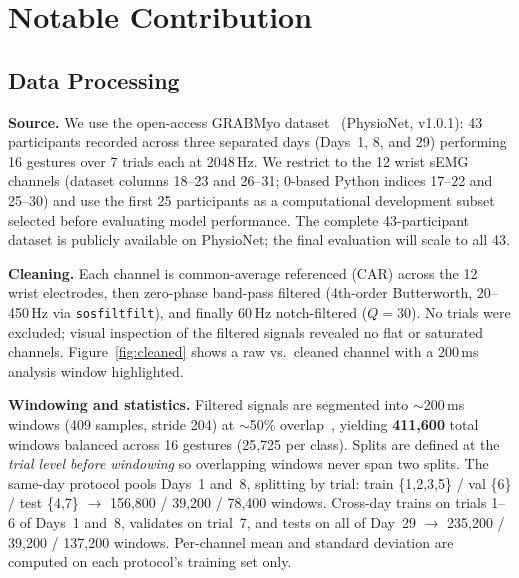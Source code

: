 \documentclass[final]{article}
\begin{document}
\section{Notable Contribution}

\subsection{Data Processing}

\textbf{Source.}
We use the open-access GRABMyo dataset~\citep{pradhan2022grabmyo,jiang2022grabmyophysionet} (PhysioNet, v1.0.1): 43 participants recorded across three separated days (Days~1, 8, and 29) performing 16 gestures over 7 trials each at 2048\,Hz. We restrict to the 12 wrist sEMG channels (dataset columns 18--23 and 26--31; 0-based Python indices 17--22 and 25--30) and use the first 25 participants as a computational development subset selected before evaluating model performance. The complete 43-participant dataset is publicly available on PhysioNet; the final evaluation will scale to all 43.

\textbf{Cleaning.}
Each channel is common-average referenced (CAR) across the 12 wrist electrodes, then zero-phase band-pass filtered (4th-order Butterworth, 20--450\,Hz via \texttt{sosfiltfilt}), and finally 60\,Hz notch-filtered ($Q\!=\!30$). No trials were excluded; visual inspection of the filtered signals revealed no flat or saturated channels. Figure~\ref{fig:cleaned} shows a raw vs.\ cleaned channel with a 200\,ms analysis window highlighted.

\textbf{Windowing and statistics.}
Filtered signals are segmented into $\sim$200\,ms windows (409 samples, stride 204) at ${\sim}$50\% overlap~\citep{smith2011window}, yielding \textbf{411{,}600} total windows balanced across 16 gestures (25{,}725 per class). Splits are defined at the \emph{trial level before windowing} so overlapping windows never span two splits. The same-day protocol pools Days~1 and~8, splitting by trial: train \{1,2,3,5\} / val \{6\} / test \{4,7\} $\to$ 156{,}800 / 39{,}200 / 78{,}400 windows. Cross-day trains on trials 1--6 of Days~1 and~8, validates on trial~7, and tests on all of Day~29 $\to$ 235{,}200 / 39{,}200 / 137{,}200 windows. Per-channel mean and standard deviation are computed on each protocol's training set only.
\end{document}
